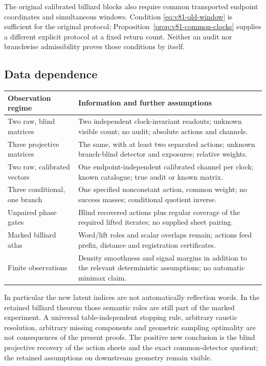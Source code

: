 The original calibrated billiard blocks also require common transported
endpoint coordinates and simultaneous windows.  Condition
\eqref{eq:v81-old-window} is sufficient for the original protocol;
Proposition~\ref{prop:v81-common-clocks} supplies a different explicit
protocol at a fixed return count.  Neither an audit nor branchwise
admissibility proves those conditions by itself.

\subsection{Data dependence}

\begin{center}
\begin{tabular}{p{}p{}}
\toprule
Observation regime & Information and further assumptions\\
\midrule
Two raw, blind matrices & Two independent clock-invariant readouts;
unknown visible count; no audit; absolute actions and channels.\\[3pt]
Three projective matrices & The same, with at least two separated
actions; unknown branch-blind detector and exposures; relative weights.\\[3pt]
Two raw, calibrated vectors & One endpoint-independent calibrated
channel per clock; known catalogue; true audit or known matrix.\\[3pt]
Three conditional, one branch & One specified nonconstant action,
common weight; no success masses; conditional quotient inverse.\\[3pt]
Unpaired phase gates & Blind recovered actions plus regular coverage
of the required lifted iterates; no supplied sheet pairing.\\[3pt]
Marked billiard atlas & Word/lift roles and scalar overlaps remain;
actions feed prefix, distance and registration certificates.\\[3pt]
Finite observations & Density smoothness and signal margins in addition
to the relevant deterministic assumptions; no automatic minimax claim.\\
\bottomrule
\end{tabular}
\end{center}

In particular the new latent indices are not automatically reflection
words.  In the retained billiard theorem those semantic roles are still
part of the marked experiment.  A universal table-independent stopping
rule, arbitrary caustic resolution, arbitrary missing components and
geometric sampling optimality are not consequences of the present
proofs.  The positive new conclusion is the blind projective recovery
of the action sheets and the exact common-detector quotient; the
retained assumptions on downstream geometry remain visible.
